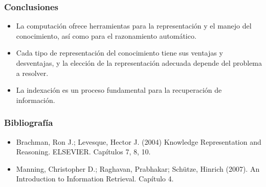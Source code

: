 \documentclass[
10pt, %
aspectratio=169, %
]{beamer}
\begin{document}
	\begin{frame}
		
		\frametitle{Conclusiones}
		
		\begin{itemize}
			
			\item La computación ofrece herramientas para la representación y el manejo del conocimiento, así como para el razonamiento automático. \\[2mm]
			
			\item Cada tipo de representación del conocimiento tiene sus ventajas y desventajas, y la elección de la representación adecuada depende del problema a resolver. \\[2mm]
			
			\item La indexación es un proceso fundamental para la recuperación de información.
			
		\end{itemize}
		
	\end{frame}
	
	\begin{frame}
		
		\frametitle{Bibliografía}
		
		\begin{itemize}
			
			\item Brachman, Ron J.; Levesque, Hector J. (2004) Knowledge Representation and Reasoning. ELSEVIER. Capítulos 7, 8, 10.
			
			\item Manning, Christopher D.; Raghavan, Prabhakar; Schütze, Hinrich (2007). An Introduction to Information Retrieval. Capítulo 4.
			
		\end{itemize}
		
	\end{frame}
	
	\begin{frame}
		\titlepage
	\end{frame}
	
	
	
\end{document}
